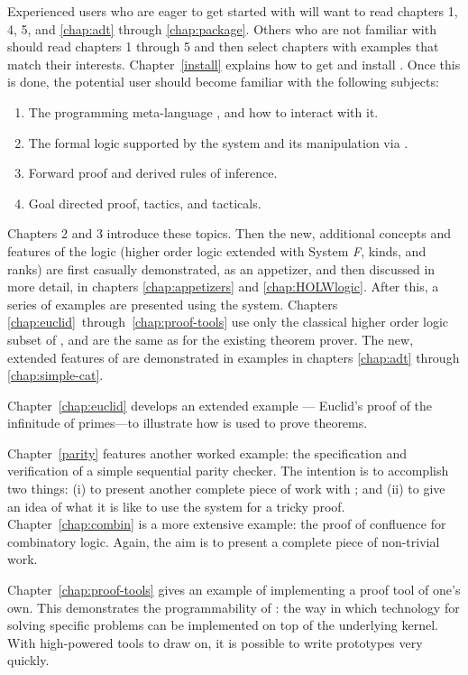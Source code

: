 Experienced \HOL{} users who are eager to get started with \HOLW{}
will want to read chapters 1, 4, 5, and
\ref{chap:adt} through \ref{chap:package}.
Others who are not familiar with \HOL{} should read chapters 1 through 5
and then select chapters with examples that match their interests.
Chapter~\ref{install} explains how to get and install \HOLW.  Once this
is done, the potential \HOLW{} user should become familiar with the
following subjects:
%
\begin{enumerate}
\item The programming meta-language \ML, and how to interact with it.
\item The formal logic supported by the \HOLW{} system
  and its manipulation via \ML.
\item Forward proof and derived rules of inference.
\item Goal directed proof, tactics, and tacticals.
\end{enumerate}
%
Chapters 2 and 3 introduce these topics. Then the new, additional
concepts and features of the \HOLW{} logic (higher order logic 
extended with System {\it F}, kinds, and ranks)
are first casually demonstrated, as an appetizer, and then
discussed in more detail, in chapters \ref{chap:appetizers} and \ref{chap:HOLWlogic}. 
After this, a series of examples are presented using the \HOLW{} system.
Chapters \ref{chap:euclid}~through~\ref{chap:proof-tools} use only the
classical higher order logic subset of \HOLW, and are
the same as for the existing \HOL{} theorem prover.
The new, extended features of \HOLW{} are demonstrated in
examples in chapters \ref{chap:adt} through \ref{chap:simple-cat}.

Chapter~\ref{chap:euclid} develops an extended example --- Euclid's
proof of the infinitude of primes---to illustrate how \HOLW{} is used
to prove theorems.


Chapter~\ref{parity} features another worked example: the specification
and verification of a simple sequential parity checker.  The intention
is to accomplish two things: (i) to present another complete piece of
work with \HOLW; and (ii) to give an idea of what it is like to use the
\HOLW{} system for a tricky proof.  Chapter~\ref{chap:combin} is a more
extensive example: the proof of confluence for combinatory
logic.  Again, the aim is to present a complete piece of non-trivial
work.

Chapter~\ref{chap:proof-tools} gives an example of implementing a
proof tool of one's own.  This demonstrates the programmability of
\HOLW: the way in which technology for solving specific problems can be
implemented on top of the underlying kernel.  With high-powered tools
to draw on, it is possible to write prototypes very quickly.

